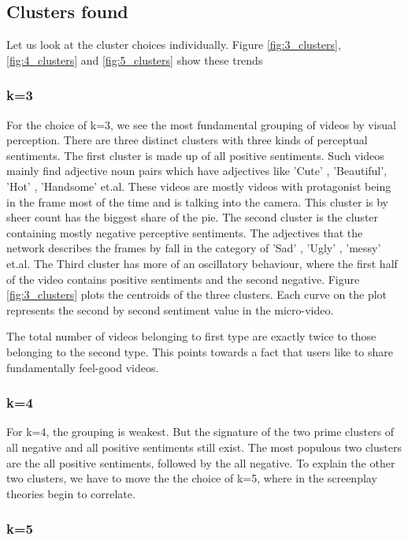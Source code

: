 \subsection{Clusters found}{
Let us look at the cluster choices individually. Figure \ref{fig:3_clusters}, \ref{fig:4_clusters} and \ref{fig:5_clusters} show these trends

\subsubsection{k=3}

For the choice of k=3, we see the most fundamental grouping of videos by visual perception. There are three distinct clusters with three kinds of perceptual sentiments. The first cluster is made up of all positive sentiments. Such videos mainly find adjective noun pairs which have adjectives like 'Cute' , 'Beautiful', 'Hot' , 'Handsome' et.al. These videos are mostly videos with protagonist being in the frame most of the time and is talking into the camera. This cluster is by sheer count has the biggest share of the pie. The second cluster is the cluster containing mostly negative perceptive sentiments. The adjectives that the network describes the frames by fall in the category of 'Sad' , 'Ugly' , 'messy' et.al.  The Third cluster has more of an oscillatory behaviour, where the first half of the video contains positive sentiments and the second negative. Figure \ref{fig:3_clusters} plots the centroids of the three clusters. Each curve on the plot represents the second by second sentiment value in the micro-video.
\par
The total number of videos belonging to first type are exactly twice to those belonging to the second type. This points towards a fact that users like to share fundamentally feel-good videos. 

\subsubsection{k=4}

For k=4, the grouping is weakest. But the signature of the two prime clusters of all negative and all positive sentiments still exist. The most populous two clusters are the all positive sentiments, followed by the all negative.  To explain the other two clusters, we have to move the the choice of k=5, where in the screenplay theories begin to correlate. 

\subsubsection{k=5}

}
